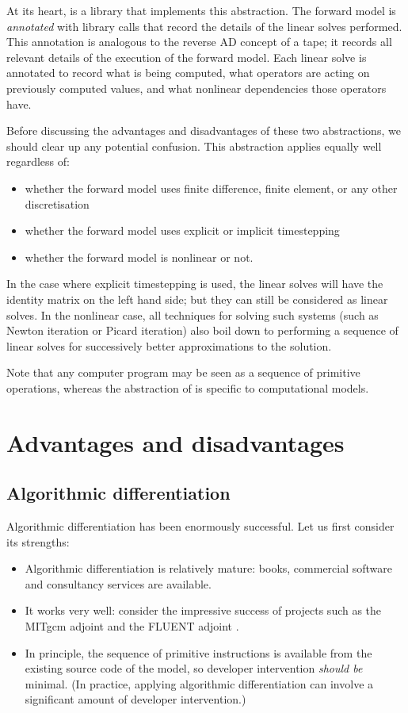 At its heart, \libadjoint is a library that implements this abstraction. The
forward model is \emph{annotated} with library calls that record the details
of the linear solves performed. This annotation is analogous to the reverse
AD concept of a tape; it records all relevant details of the execution of
the forward model. Each linear solve is annotated to record what is being
computed, what operators are acting on previously computed values, and what
nonlinear dependencies those operators have.

Before discussing the advantages and disadvantages of these two abstractions, 
we should clear up any potential confusion. This abstraction applies equally
well regardless of:
\begin{itemize}
\item whether the forward model uses finite difference, finite
element, or any other discretisation
\item whether the forward model uses explicit or implicit timestepping
\item whether the forward model is nonlinear or not.
\end{itemize}

In the case where explicit timestepping is used, the linear solves
will have the identity matrix on the left hand side; but they can still
be considered as linear solves. In the nonlinear case, all techniques for
solving such systems (such as Newton iteration or Picard iteration) also
boil down to performing a sequence of linear solves for successively better
approximations to the solution.

Note that any computer program may be seen as a sequence of primitive operations, 
whereas the abstraction of \libadjoint is specific to computational models.

\section{Advantages and disadvantages}
\subsection{Algorithmic differentiation}
Algorithmic differentiation has been enormously
successful. Let us first consider its strengths:
\begin{itemize}
\item Algorithmic differentiation is relatively mature: books, commercial
software and consultancy services are available.
\item It works very well: consider the impressive success of projects such as the
MITgcm adjoint \citep{heimbach2002,heimbach2005} and the FLUENT adjoint \citep{bischof2007}.
\item In principle, the sequence of primitive instructions is available from
the existing source code of the model, so developer intervention \emph{should
be} minimal. (In practice, applying algorithmic differentiation can involve a significant
amount of developer intervention.)
\end{itemize}

